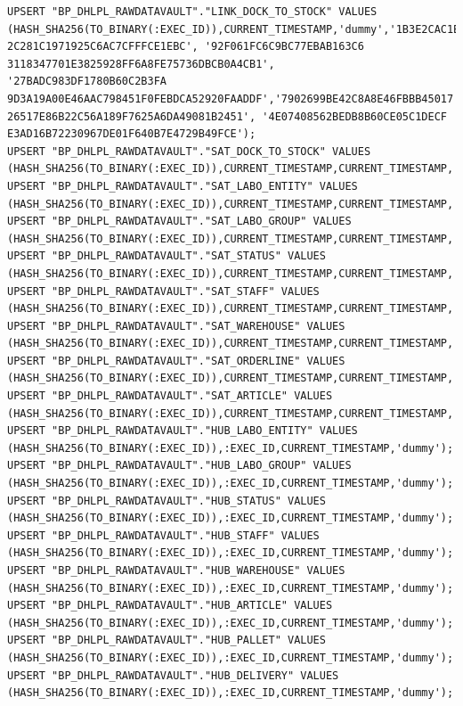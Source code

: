 \begin{lstlisting}[frame=single]
UPSERT "BP_DHLPL_RAWDATAVAULT"."LINK_DOCK_TO_STOCK" VALUES (HASH_SHA256(TO_BINARY(:EXEC_ID)),CURRENT_TIMESTAMP,'dummy','1B3E2CAC1E858C5C078BE89E8DB166CA019A 2C281C1971925C6AC7CFFFCE1EBC', '92F061FC6C9BC77EBAB163C6 3118347701E3825928FF6A8FE75736DBCB0A4CB1',
'27BADC983DF1780B60C2B3FA 9D3A19A00E46AAC798451F0FEBDCA52920FAADDF','7902699BE42C8A8E46FBBB45017 26517E86B22C56A189F7625A6DA49081B2451', '4E07408562BEDB8B60CE05C1DECF E3AD16B72230967DE01F640B7E4729B49FCE');
UPSERT "BP_DHLPL_RAWDATAVAULT"."SAT_DOCK_TO_STOCK" VALUES (HASH_SHA256(TO_BINARY(:EXEC_ID)),CURRENT_TIMESTAMP,CURRENT_TIMESTAMP,'dummy','1',1,1,1,1,1,1,1,1,1);
UPSERT "BP_DHLPL_RAWDATAVAULT"."SAT_LABO_ENTITY" VALUES (HASH_SHA256(TO_BINARY(:EXEC_ID)),CURRENT_TIMESTAMP,CURRENT_TIMESTAMP,'dummy','1','naam');
UPSERT "BP_DHLPL_RAWDATAVAULT"."SAT_LABO_GROUP" VALUES (HASH_SHA256(TO_BINARY(:EXEC_ID)),CURRENT_TIMESTAMP,CURRENT_TIMESTAMP,'dummy','1','naam');
UPSERT "BP_DHLPL_RAWDATAVAULT"."SAT_STATUS" VALUES (HASH_SHA256(TO_BINARY(:EXEC_ID)),CURRENT_TIMESTAMP,CURRENT_TIMESTAMP,'dummy','1','naam');
UPSERT "BP_DHLPL_RAWDATAVAULT"."SAT_STAFF" VALUES (HASH_SHA256(TO_BINARY(:EXEC_ID)),CURRENT_TIMESTAMP,CURRENT_TIMESTAMP,'dummy','1','naam');
UPSERT "BP_DHLPL_RAWDATAVAULT"."SAT_WAREHOUSE" VALUES (HASH_SHA256(TO_BINARY(:EXEC_ID)),CURRENT_TIMESTAMP,CURRENT_TIMESTAMP,'dummy','1','naam');
UPSERT "BP_DHLPL_RAWDATAVAULT"."SAT_ORDERLINE" VALUES (HASH_SHA256(TO_BINARY(:EXEC_ID)),CURRENT_TIMESTAMP,CURRENT_TIMESTAMP,'dummy','1',1);
UPSERT "BP_DHLPL_RAWDATAVAULT"."SAT_ARTICLE" VALUES (HASH_SHA256(TO_BINARY(:EXEC_ID)),CURRENT_TIMESTAMP,CURRENT_TIMESTAMP,'dummy','1','naam');
UPSERT "BP_DHLPL_RAWDATAVAULT"."HUB_LABO_ENTITY" VALUES (HASH_SHA256(TO_BINARY(:EXEC_ID)),:EXEC_ID,CURRENT_TIMESTAMP,'dummy');
UPSERT "BP_DHLPL_RAWDATAVAULT"."HUB_LABO_GROUP" VALUES (HASH_SHA256(TO_BINARY(:EXEC_ID)),:EXEC_ID,CURRENT_TIMESTAMP,'dummy');
UPSERT "BP_DHLPL_RAWDATAVAULT"."HUB_STATUS" VALUES (HASH_SHA256(TO_BINARY(:EXEC_ID)),:EXEC_ID,CURRENT_TIMESTAMP,'dummy');
UPSERT "BP_DHLPL_RAWDATAVAULT"."HUB_STAFF" VALUES (HASH_SHA256(TO_BINARY(:EXEC_ID)),:EXEC_ID,CURRENT_TIMESTAMP,'dummy');
UPSERT "BP_DHLPL_RAWDATAVAULT"."HUB_WAREHOUSE" VALUES (HASH_SHA256(TO_BINARY(:EXEC_ID)),:EXEC_ID,CURRENT_TIMESTAMP,'dummy');
UPSERT "BP_DHLPL_RAWDATAVAULT"."HUB_ARTICLE" VALUES (HASH_SHA256(TO_BINARY(:EXEC_ID)),:EXEC_ID,CURRENT_TIMESTAMP,'dummy');
UPSERT "BP_DHLPL_RAWDATAVAULT"."HUB_PALLET" VALUES (HASH_SHA256(TO_BINARY(:EXEC_ID)),:EXEC_ID,CURRENT_TIMESTAMP,'dummy');
UPSERT "BP_DHLPL_RAWDATAVAULT"."HUB_DELIVERY" VALUES (HASH_SHA256(TO_BINARY(:EXEC_ID)),:EXEC_ID,CURRENT_TIMESTAMP,'dummy');

\end{lstlisting}
